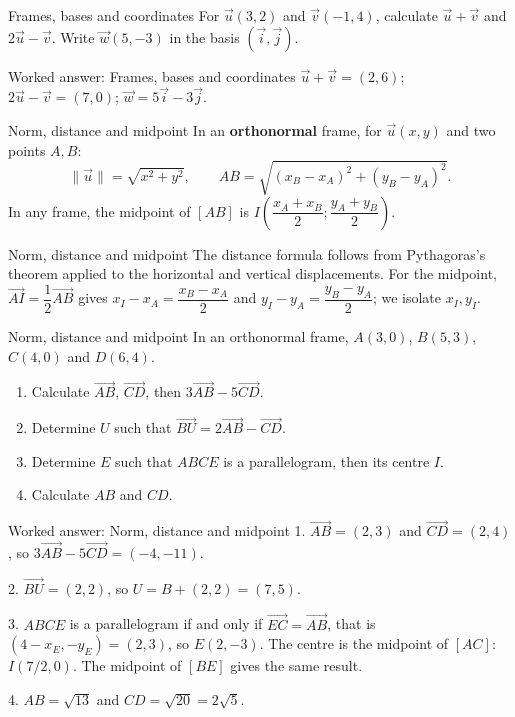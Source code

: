 \documentclass[aspectratio=169,10pt]{beamer}
\providecommand{\vect}[1]{\overrightarrow{#1}}
\begin{document}
\begin{frame}{Frames, bases and coordinates}
For \(\vec u(3,2)\) and \(\vec v(-1,4)\), calculate \(\vec u+\vec v\) and \(2\vec u-\vec v\). Write \(\vec w(5,-3)\) in the basis \((\vec i,\vec j)\).
\end{frame}
\begin{frame}{Worked answer: Frames, bases and coordinates}
\(\vec u+\vec v=(2,6)\); \(2\vec u-\vec v=(7,0)\); \(\vec w=5\vec i-3\vec j\).
\end{frame}
\begin{frame}{Norm, distance and midpoint}
In an \textbf{orthonormal} frame, for \(\vec u(x,y)\) and two points \(A,B\):
\[\|\vec u\|=\sqrt{x^2+y^2},\qquad AB=\sqrt{(x_B-x_A)^2+(y_B-y_A)^2}.\]
In any frame, the midpoint of \([AB]\) is \(I\left(\dfrac{x_A+x_B}{2};\dfrac{y_A+y_B}{2}\right)\).
\end{frame}
\begin{frame}{Norm, distance and midpoint}
The distance formula follows from Pythagoras's theorem applied to the horizontal and vertical displacements. For the midpoint, \(\vect{AI}=\dfrac12\vect{AB}\) gives \(x_I-x_A=\dfrac{x_B-x_A}{2}\) and \(y_I-y_A=\dfrac{y_B-y_A}{2}\); we isolate \(x_I,y_I\).
\end{frame}
\begin{frame}{Norm, distance and midpoint}
In an orthonormal frame, \(A(3,0)\), \(B(5,3)\), \(C(4,0)\) and \(D(6,4)\).

\begin{enumerate}
\setcounter{enumi}{0}
\item Calculate \(\vect{AB}\), \(\vect{CD}\), then \(3\vect{AB}-5\vect{CD}\).

\item Determine \(U\) such that \(\vect{BU}=2\vect{AB}-\vect{CD}\).

\item Determine \(E\) such that \(ABCE\) is a parallelogram, then its centre \(I\).

\item Calculate \(AB\) and \(CD\).

\end{enumerate}
\end{frame}
\begin{frame}{Worked answer: Norm, distance and midpoint}
1. \(\vect{AB}=(2,3)\) and \(\vect{CD}=(2,4)\), so \(3\vect{AB}-5\vect{CD}=(-4,-11)\).

2. \(\vect{BU}=(2,2)\), so \(U=B+(2,2)=(7,5)\).

3. \(ABCE\) is a parallelogram if and only if \(\vect{EC}=\vect{AB}\), that is \((4-x_E,-y_E)=(2,3)\), so \(E(2,-3)\). The centre is the midpoint of \([AC]\): \(I(7/2,0)\). The midpoint of \([BE]\) gives the same result.

4. \(AB=\sqrt{13}\) and \(CD=\sqrt{20}=2\sqrt5\).
\end{frame}
\end{document}
